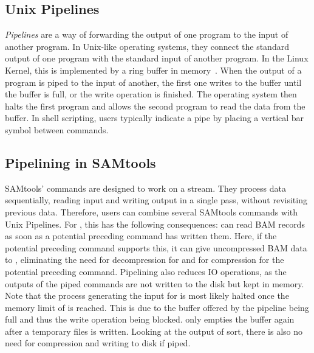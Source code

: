 \subsection{Unix Pipelines}

\textit{Pipelines} are a way of forwarding the output of one program to the input of another program. In Unix-like operating systems, they connect the standard output of one program with the standard input of another program. In the Linux Kernel, this is implemented by a ring buffer in memory~\cite{noauthor_linuxfspipec_nodate}. When the output of a program is piped to the input of another, the first one writes to the buffer until the buffer is full, or the write operation is finished. The operating system then halts the first program and allows the second program to read the data from the buffer. In shell scripting, users typically indicate a pipe by placing a vertical bar symbol between commands.



\subsection{Pipelining in SAMtools}
SAMtools' commands are designed to work on a stream. They process data sequentially, reading input and writing output in a single pass, without revisiting previous data.
Therefore, users can combine several SAMtools commands with Unix Pipelines. For \sort, this has the following consequences: \sort can read BAM records as soon as a potential preceding command has written them. Here, if the potential preceding command supports this, it can give uncompressed BAM data to \sort, eliminating the need for decompression for \sort and for compression for the potential preceding command. Pipelining also reduces IO operations, as the outputs of the piped commands are not written to the disk but kept in memory. Note that the process generating the input for \sort is most likely halted once the memory limit of \sort is reached. This is due to the buffer offered by the pipeline being full and thus the write operation being blocked. \sort only empties the buffer again after a temporary files is written. Looking at the output of sort, there is also no need for compression and writing to disk if piped. 

